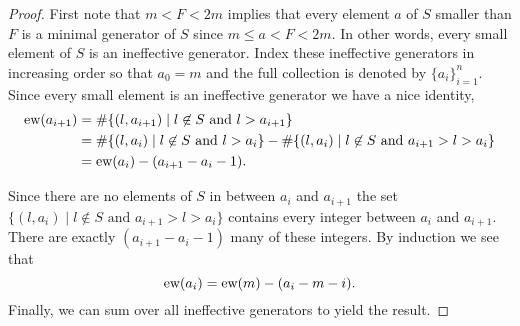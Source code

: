 \documentclass[11pt]{article}
\begin{document}
\begin{proof}
First note that \(m < F < 2m\) implies that every element \(a\) of \(S\) smaller than \(F\) is a minimal generator of \(S\) since \(m \le a < F < 2m\). In other words, every small element of \(S\) is an ineffective generator. Index these ineffective generators in increasing order so that \(a_0 = m\) and the full collection is denoted by \(\{a_i\}_{i=1}^n\). Since every small element is an ineffective generator we have a nice identity,
    \begin{align*}
    \text{ew}(a_{i+1}) &= \#\{(l, a_{i+1}) \mid l \not\in S \text{ and } l > a_{i+1}\} \\
    &= \#\{(l, a_{i}) \mid l \not\in S \text{ and } l > a_i\} - \#\{(l, a_{i}) \mid l \not\in S \text{ and } a_{i+1} > l > a_{i}\} \\
    &= \text{ew}(a_i) - (a_{i+1} - a_i - 1).
    \end{align*}

Since there are no elements of \(S\) in between \(a_i\) and \(a_{i+1}\) the set  \(\{(l, a_{i}) \mid l \not\in S \text{ and } a_{i+1} > l > a_{i}\}\) contains every integer between \(a_i\) and \(a_{i+1}\). There are exactly \( (a_{i+1} - a_i - 1)\) many of these integers. By induction we see that \[\text{ew}(a_i) = \text{ew}(m) - (a_i - m - i).\] Finally, we can sum over all ineffective generators to yield the result.
\end{proof}
\end{document}
